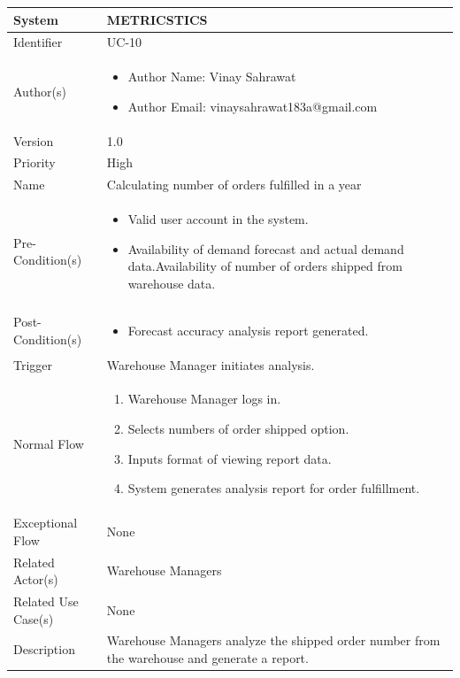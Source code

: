 \begin{center}
	\begin{tabularx}{\textwidth}{|l|X|}
		\hline
		System & METRICSTICS \\
		\hline
		Identifier & UC-10 \\
		\hline
		Author(s) & \begin{itemize}[left=0pt]
			\item Author Name: Vinay Sahrawat
			\item Author Email: vinaysahrawat183a@gmail.com
		\end{itemize} \\
		\hline
		Version & 1.0 \\
		\hline
		Priority & High \\
		\hline
		Name & Calculating number of orders fulfilled in a year \\
		\hline
		Pre-Condition(s) &  \begin{itemize}[left=0pt]
			\item Valid user account in the system.
			\item Availability of demand forecast and actual demand data.Availability of number of orders shipped from warehouse data.
		\end{itemize} \\
		\hline
		Post-Condition(s) & \begin{itemize}[left=0pt]
			\item Forecast accuracy analysis report generated.
		\end{itemize} \\
		\hline
		Trigger & Warehouse Manager initiates analysis. \\
		\hline
		Normal Flow & \begin{enumerate}[left=0pt]
			\item Warehouse Manager logs in.
			\item Selects numbers of order shipped option.
			\item Inputs format of viewing report data.
			\item System generates analysis report for order fulfillment.
		\end{enumerate} \\
		\hline
		Exceptional Flow & None \\
		\hline
		Related Actor(s) & Warehouse Managers \\
		\hline
		Related Use Case(s) & None \\
		\hline
		Description & Warehouse Managers analyze the shipped order number from the warehouse and generate a report. \\
		\hline
	\end{tabularx}
\end{center}




